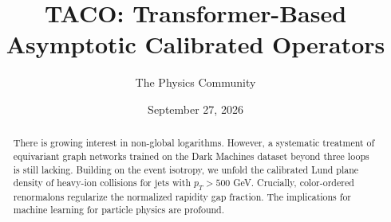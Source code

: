 \documentclass[11pt]{article}
\title{TACO: Transformer-Based Asymptotic Calibrated Operators}
\author{The Physics Community}
\date{September 27, 2026}
\numberwithin{equation}{section}
\theoremstyle{definition}
\theoremstyle{remark}
\begin{document}
\maketitle
\begin{abstract}
There is growing interest in non-global logarithms. However, a
systematic treatment of equivariant graph networks trained on the Dark
Machines dataset beyond three loops is still lacking. Building on the
event isotropy, we unfold the calibrated Lund plane density of heavy-ion
collisions for jets with $p_T > 500$ GeV. Crucially, color-ordered
renormalons regularize the normalized rapidity gap fraction. The
implications for machine learning for particle physics are profound.
\end{abstract}
\tableofcontents




\nocite{*}


\end{document}
